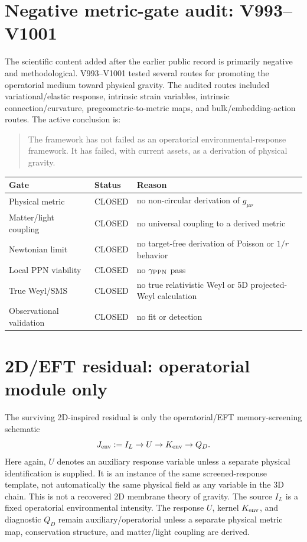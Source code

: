 \documentclass[11pt,a4paper]{article}
\begin{document}
\section{Negative metric-gate audit: V993--V1001}
The scientific content added after the earlier public record is primarily negative and methodological. V993--V1001 tested several routes for promoting the operatorial medium toward physical gravity. The audited routes included variational/elastic response, intrinsic strain variables, intrinsic connection/curvature, pregeometric-to-metric maps, and bulk/embedding-action routes. The active conclusion is:

\begin{quote}
The framework has not failed as an operatorial environmental-response framework. It has failed, with current assets, as a derivation of physical gravity.
\end{quote}

\begin{tabularx}{\textwidth}{L{0.23\textwidth}L{0.16\textwidth}Y}
\toprule
Gate & Status & Reason \\
\midrule
Physical metric & CLOSED & no non-circular derivation of $g_{\mu\nu}$ \\
Matter/light coupling & CLOSED & no universal coupling to a derived metric \\
Newtonian limit & CLOSED & no target-free derivation of Poisson or $1/r$ behavior \\
Local PPN viability & CLOSED & no $\gamma_{\rm PPN}$ pass \\
True Weyl/SMS & CLOSED & no true relativistic Weyl or 5D projected-Weyl calculation \\
Observational validation & CLOSED & no fit or detection \\
\bottomrule
\end{tabularx}

\section{2D/EFT residual: operatorial module only}
The surviving 2D-inspired residual is only the operatorial/EFT memory-screening schematic
\[
J_{\rm env} := I_L \rightarrow U \rightarrow K_{\rm env} \rightarrow Q_D.
\]
Here again, $U$ denotes an auxiliary response variable unless a separate physical identification is supplied. It is an instance of the same screened-response template, not automatically the same physical field as any variable in the 3D chain. This is not a recovered 2D membrane theory of gravity. The source $I_L$ is a fixed operatorial environmental intensity. The response $U$, kernel $K_{\rm env}$, and diagnostic $Q_D$ remain auxiliary/operatorial unless a separate physical metric map, conservation structure, and matter/light coupling are derived.
\end{document}
